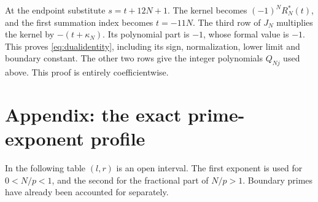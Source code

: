 \documentclass[11pt]{article}
\begin{document}
At the endpoint substitute $s=t+12N+1$. The kernel becomes
$(-1)^NR_N^*(t)$, and the first summation index becomes $t=-11N$.
The third row of $J_N$ multiplies the kernel by $-(t+\kappa_N)$.
Its polynomial part is $-1$, whose formal value is $-1$.
This proves \eqref{eq:dualidentity}, including its sign, normalization,
lower limit and boundary constant. The other two rows give the integer
polynomials $Q_{Nj}$ used above. This proof is entirely coefficientwise.

\appendix
\section*{Appendix: the exact prime-exponent profile}
In the following table $(l,r)$ is an open interval. The first exponent is
used for $0<N/p<1$, and the second for the fractional part of $N/p>1$.
Boundary primes have already been accounted for separately.
\end{document}
